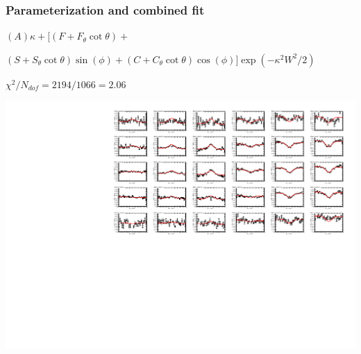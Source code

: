 \documentclass[compress]{beamer}
\begin{document}
\begin{frame}
\frametitle{Parameterization and combined fit}

$(A)\kappa + \big[(F + F_{\theta}\cot\theta) + $

\hfill $(S + S_{\theta}\cot\theta)\sin(\phi) + (C + C_{\theta}\cot\theta)\cos(\phi)\big]\exp(-\kappa^2 W^2 / 2)$

\begin{center}
$\chi^2/N_{dof} = 2194/1066 = 2.06$
\end{center}
\includegraphics[width=\linewidth]{allfits.pdf}
\end{frame}
\end{document}
